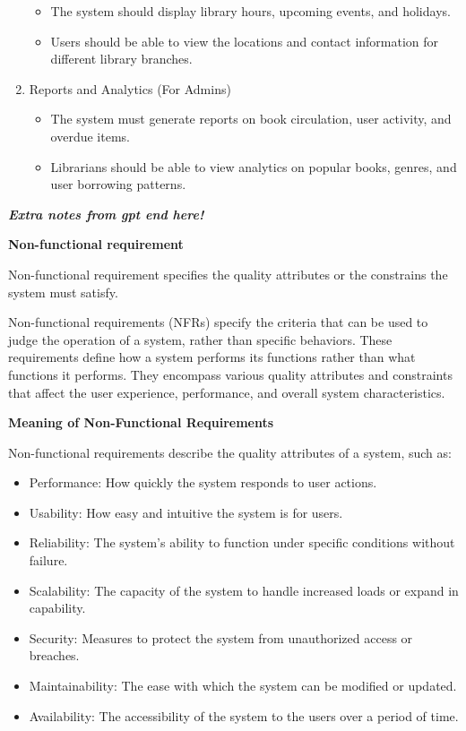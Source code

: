 \documentclass[a4paper]{article}
\begin{document}
\begin{enumerate}[(1)]
\begin{itemize}
                \item  The system should display library hours, upcoming events, and holidays.
                \item  Users should be able to view the locations and contact information for different library branches.
            \end{itemize}
        \item Reports and Analytics (For Admins)
            \begin{itemize}
                \item  The system must generate reports on book circulation, user activity, and overdue items.
                \item  Librarians should be able to view analytics on popular books, genres, and user borrowing patterns.
            \end{itemize}
    \end{enumerate}
\textbf{\textit{Extra notes from gpt end here! }}

\vspace{0.5 cm}
\begin{Large}\textbf{Non-functional requirement}\end{Large}

Non-functional requirement specifies the quality attributes or the constrains the system must satisfy.

Non-functional requirements (NFRs) specify the criteria that can be used to judge the operation of a system, rather than specific behaviors. 
These requirements define how a system performs its functions rather than what functions it performs. They encompass various quality attributes and 
constraints that affect the user experience, performance, and overall system characteristics.

\textbf {Meaning of Non-Functional Requirements}

Non-functional requirements describe the quality attributes of a system, such as:
\begin{itemize}
    \item Performance: How quickly the system responds to user actions.
    \item Usability: How easy and intuitive the system is for users.
    \item Reliability: The system's ability to function under specific conditions without failure.
    \item Scalability: The capacity of the system to handle increased loads or expand in capability.
    \item Security: Measures to protect the system from unauthorized access or breaches.
    \item Maintainability: The ease with which the system can be modified or updated.
    \item Availability: The accessibility of the system to the users over a period of time.
\end{itemize}
\end{document}
